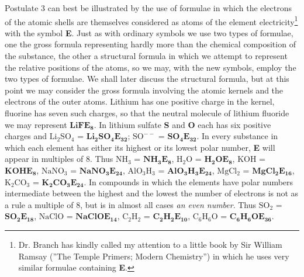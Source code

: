 \documentclass[11pt]{memoir}
\begin{document}
Postulate 3 can best be illustrated by the use of formulae in which the electrons of the atomic shells are themselves considered as atoms of the element electricity\footnote{Dr. Branch has kindly called my attention to a little book by Sir William Ramsay (''The Temple Primers; Modern Chemistry'') in which he uses very similar formulae containing \textbf{E}.} with the symbol \textbf{E}.  Just as with ordinary symbols we use two types of formulae, one the gross formula representing hardly more than the chemical composition of the substance, the other a structural formula in which we attempt to represent the relative positions of the atoms, so we may, with the new symbols, employ the two types of formulae.  We shall later discuss the structural formula, but at this point we may consider the gross formula involving the atomic kernels and the electrons of the outer atoms.  Lithium has one positive charge in the kernel, fluorine has seven such charges, so that the neutral molecule of lithium fluoride we may represent $\mathbf{LiFE_8}$. In lithium sulfate \textbf{S} and \textbf{O} each has six positive charges and $\mathrm{Li_{2}SO_4}$ = $\mathbf{Li_2SO_4E_{32}}$; $\mathrm{SO^{--}}$ = $\mathbf{SO_4E_{32}}$.  In every substance in which each element has either its highest or its lowest polar number, \textbf{E} will appear in multiples of 8.  Thus $\mathrm{NH_3}$ = $\mathbf{NH_3E_8}$, $\mathrm{H_2O}$ = $\mathbf{H_2OE_8}$, $\mathrm{KOH}$ = $\mathbf{KOHE_8}$, $\mathrm{NaNO_3}$ = $\mathbf{NaNO_3E_{24}}$, $\mathrm{AlO_3H_3}$ = $\mathbf{AlO_3H_3E_{24}}$, $\mathrm{MgCl_2}$ = $\mathbf{MgCl_2E_{16}}$, $\mathrm{K_2CO_3}$ = $\mathbf{K_2CO_3E_{24}}$.  In compounds in which the elements have polar numbers intermediate between the highest and the lowest the number of electrons is not as a rule a multiple of 8, but is in almost all cases \emph{an even number}.  Thus $\mathrm{SO_2}$ = $\mathbf{SO_2E_{18}}$, $\mathrm{NaClO}$ = $\mathbf{NaClOE_{14}}$, $\mathrm{C_2H_2}$ = $\mathbf{C_2H_2E_{10}}$, $\mathrm{C_6H_6O}$ = $\mathbf{C_6H_6OE_{36}}$.
\end{document}
